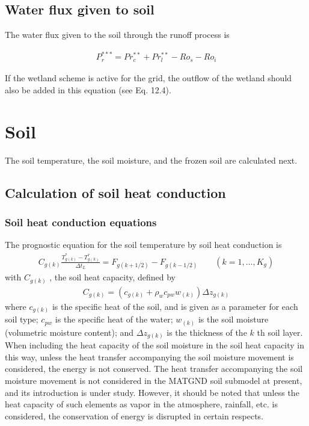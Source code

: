 \hypertarget{water-flux-given-to-soil}{%
\subsection{Water flux given to soil}\label{water-flux-given-to-soil}}

The water flux given to the soil through the runoff process is

\begin{eqnarray}
P_r^{\ast\ast\ast} = Pr^{\ast\ast}_c + Pr^{\ast\ast}_l - Ro_s - Ro_i
 \label{eq293}
\end{eqnarray}

If the wetland scheme is active for the grid, the outflow of the wetland should also be added in this equation (see Eq. 12.4).

\hypertarget{soil}{%
\section{Soil}\label{soil}}

The soil temperature, the soil moisture, and the frozen soil are calculated next.

\hypertarget{calculation-of-soil-heat-conduction}{%
\subsection{Calculation of soil heat conduction}\label{calculation-of-soil-heat-conduction}}

\hypertarget{soil-heat-conduction-equations}{%
\subsubsection{Soil heat conduction equations}\label{soil-heat-conduction-equations}}

The prognostic equation for the soil temperature by soil heat conduction is \begin{eqnarray}
C_{g(k)} \frac{T_{g(k)}^\ast - T_{g(k)}^{\tau}}{\Delta t_L} = F_{g(k+1/2)} - F_{g(k-1/2)}
\qquad (k=1,\ldots,K_{g}) \label{eq289}
\end{eqnarray} with \(C_{g(k)}\) , the soil heat capacity, defined by \begin{eqnarray}
 C_{g(k)} = ( c_{g(k)} + \rho_w c_{pw} w_{(k)} ) \Delta z_{g(k)}
\end{eqnarray} where \(c_{g(k)}\) is the specific heat of the soil, and is given as a parameter for each soil type; \(c_{pw}\) is the specific heat of the water; \(w_{(k)}\) is the soil moisture (volumetric
moisture content); and \(\Delta z_{g(k)}\) is the thickness of the \(k\) th soil layer. When including the heat capacity of the soil moisture in the soil heat capacity in this way, unless the heat
transfer accompanying the soil moisture movement is considered, the energy is not conserved. The heat transfer accompanying the soil moisture movement is not considered in the MATGND soil submodel at
present, and its introduction is under study. However, it should be noted that unless the heat capacity of such elements as vapor in the atmosphere, rainfall, etc. is considered, the conservation of
energy is disrupted in certain respects.

